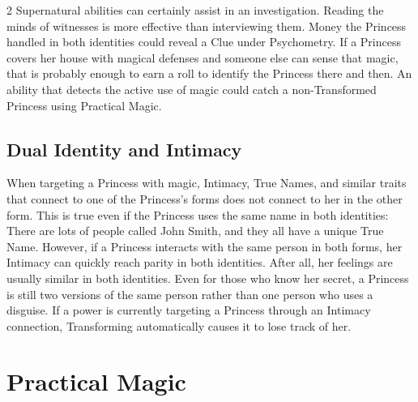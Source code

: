 \begin{multicols}{2}
Supernatural abilities can certainly assist in an investigation. Reading the minds of witnesses is more effective than interviewing them. Money the Princess handled in both identities could reveal a Clue under Psychometry. If a Princess covers her house with magical defenses and someone else can sense that magic, that is probably enough to earn a roll to identify the Princess there and then. An ability that detects the active use of magic could catch a non-Transformed Princess using Practical Magic. 

\subsection*{Dual Identity and Intimacy}

When targeting a Princess with magic, Intimacy, True Names, and similar traits that connect to one of the Princess's forms does not connect to her in the other form. This is true even if the Princess uses the same name in both identities: There are lots of people called John Smith, and they all have a unique True Name. However, if a Princess interacts with the same person in both forms, her Intimacy can quickly reach parity in both identities. After all, her feelings are usually similar in both identities. Even for those who know her secret, a Princess is still two versions of the same person rather than one person who uses a disguise. If a power is currently targeting a Princess through an Intimacy connection, Transforming automatically causes it to lose track of her. 

\section*{Practical Magic}


\end{multicols}
